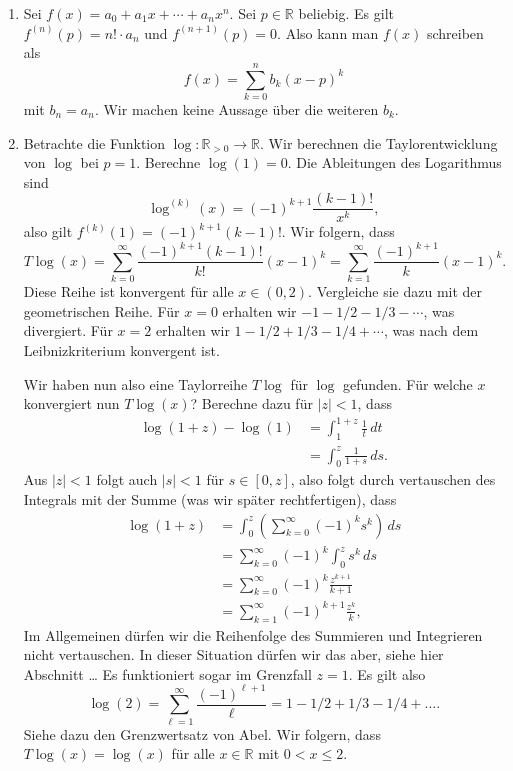 \documentclass[../main.tex]{subfiles}
\begin{document}
\begin{examples}
  \leavevmode
  \begin{enumerate}[(1)]
    \item Sei $f(x) = a_0 + a_1 x + \cdots + a_n x^n$.
      Sei $p \in \mathbb{R}$ beliebig.
      Es gilt $f^{(n)}(p) = n! \cdot a_n$ und
      $f^{(n+1)}(p) = 0$. Also kann man $f(x)$ schreiben als
      \[
        f(x) = \sum_{k=0}^{n} b_k {(x - p)}^k
      \]
      mit $b_n = a_n$. Wir machen keine Aussage über die weiteren $b_k$.
    \item Betrachte die Funktion  $\log \colon \mathbb{R}_{>0} \to \mathbb{R}$.
      Wir berechnen die Taylorentwicklung von $\log$ bei $p = 1$.
      Berechne $\log(1) = 0$. Die Ableitungen des Logarithmus sind
      \[
        \log^{(k)}(x) = {(-1)}^{k+1} \frac{(k-1)!}{x^k},
      \]
      also gilt $f^{(k)}(1) = {(-1)}^{k+1} (k-1)!$.
      Wir folgern, dass
      \[
        T\log(x) = \sum_{k=0}^{\infty} \frac{{(-1)}^{k+1}(k-1)!}{k!}{(x-1)}^k
        = \sum_{k=1}^{\infty} \frac{{(-1)}^{k+1}}{k}{(x-1)}^k.
      \]
      Diese Reihe ist konvergent für alle $x \in (0, 2)$.
      Vergleiche sie dazu mit der geometrischen Reihe.
      Für $x = 0$ erhalten wir $-1 -1/2 - 1/3 - \cdots$, was divergiert.
      Für $x = 2$ erhalten wir $1 - 1/2 + 1/3 - 1/4 + \cdots$, was nach
      dem Leibnizkriterium konvergent ist.

      Wir haben nun also eine Taylorreihe $T\log$ für $\log$ gefunden.
      Für welche $x$ konvergiert nun $T\log(x)$?
      Berechne dazu für $|z| < 1$, dass
      \begin{align*}
         \log(1 + z) - \log(1)
         &= \int_{1}^{1+z} \frac{1}{t} \, dt  \\
         &= \int_{0}^{z} \frac{1}{1+s} \, ds.
      \end{align*}
      Aus $|z| < 1$ folgt auch $|s| < 1$ für $s \in [0, z]$, also folgt
      durch vertauschen des Integrals mit der Summe (was wir später rechtfertigen),
      dass
      \begin{align*}
        \log(1+z)
        & = \int_{0}^{z} \left( \sum_{k=0}^{\infty} {(-1)}^k s^k \right) \, ds\\
        &= \sum_{k=0}^{\infty} {(-1)}^k \int_{0}^{z} s^k \, ds\\
        &= \sum_{k=0}^{\infty} {(-1)}^k \frac{z^{k+1}}{k+1}\\
        &= \sum_{k=1}^{\infty} {(-1)}^{k+1} \frac{z^k}{k},
      \end{align*}
      Im Allgemeinen dürfen wir die Reihenfolge des Summieren und Integrieren
      nicht vertauschen. In dieser Situation dürfen wir das aber, 
      siehe hier Abschnitt \dots %
      Es funktioniert sogar im Grenzfall $z = 1$. Es gilt also
      \[
        \log(2) = \sum_{\ell = 1}^{\infty} \frac{{(-1)}^{\ell+1}}{\ell}
        = 1 - 1/2 + 1/3 - 1/4 + \dots.
      \]
      Siehe dazu den Grenzwertsatz von Abel.
      Wir folgern, dass $T\log(x) = \log(x)$ für alle $x \in \mathbb{R}$
      mit $0 < x \leq 2$.
  \end{enumerate}
\end{examples}
\end{document}
